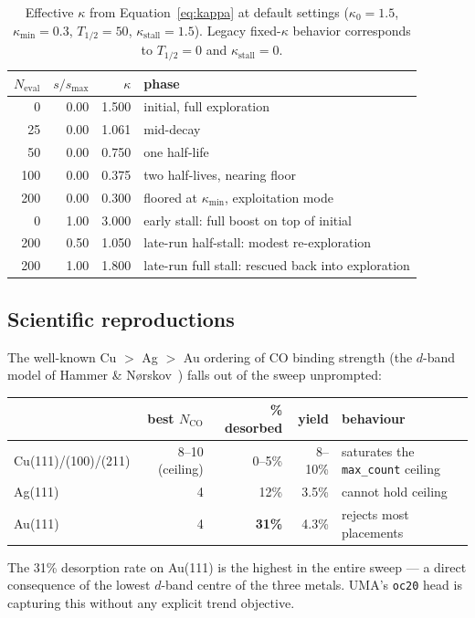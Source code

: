 \documentclass[11pt,letterpaper]{article}
\begin{document}
\begin{table}[H]
\centering\small
\begin{tabular}{@{}rrrl@{}}
\toprule
$N_{\text{eval}}$ & $s/s_{\max}$ & $\kappa$ & phase \\
\midrule
 0   & 0.00 & 1.500 & initial, full exploration \\
25   & 0.00 & 1.061 & mid-decay \\
50   & 0.00 & 0.750 & one half-life \\
100  & 0.00 & 0.375 & two half-lives, nearing floor \\
200  & 0.00 & 0.300 & floored at $\kappa_{\min}$, exploitation mode \\
 0   & 1.00 & 3.000 & early stall: full boost on top of initial \\
200  & 0.50 & 1.050 & late-run half-stall: modest re-exploration \\
200  & 1.00 & 1.800 & late-run full stall: rescued back into exploration \\
\bottomrule
\end{tabular}
\caption{Effective $\kappa$ from Equation~\ref{eq:kappa} at default
settings ($\kappa_0 = 1.5$, $\kappa_{\min} = 0.3$, $T_{1/2} = 50$,
$\kappa_{\text{stall}} = 1.5$). Legacy fixed-$\kappa$ behavior
corresponds to $T_{1/2} = 0$ and $\kappa_{\text{stall}} = 0$.}
\label{tab:kappa}
\end{table}

\subsection{Scientific reproductions}
\label{sec:physics-reproductions}

\begin{keyfindings}
The well-known Cu $>$ Ag $>$ Au ordering of CO binding strength (the
$d$-band model of Hammer \& N{\o}rskov~\citep{hammer2000}) falls out
of the sweep unprompted:

\begin{center}\small
\begin{tabular}{lrrrl}
\toprule
             & best $N_{\text{CO}}$ & \% desorbed & yield & behaviour                                 \\
\midrule
Cu(111)/(100)/(211) & 8--10 (ceiling) & 0--5\%  & 8--10\% & saturates the \texttt{max\_count} ceiling \\
Ag(111)             &    4            &  12\%   &   3.5\% & cannot hold ceiling                       \\
Au(111)             &    4            & \textbf{31\%} & 4.3\%   & rejects most placements                  \\
\bottomrule
\end{tabular}
\end{center}
\vspace{4pt}

The 31\% desorption rate on Au(111) is the highest in the entire
sweep — a direct consequence of the lowest $d$-band centre of the
three metals. UMA's \texttt{oc20} head is capturing this without any
explicit trend objective.
\end{keyfindings}
\end{document}
